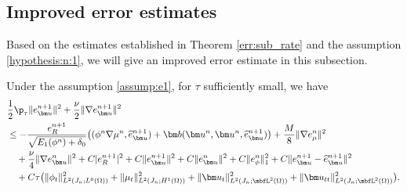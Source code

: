 \subsection{Improved error estimates } \label{subsec:full_rate}
Based on the estimates established in Theorem \ref{err:sub_rate} and the assumption \eqref{hypothesis:n:1}, we will give an improved error estimate in this subsection.

\begin{lemma}\label{err:full:eu}
	Under the assumption \eqref{assump:e1}, 	for $\tau$ sufficiently small, we have
	\begin{equation*}   
		\begin{aligned}
			& \frac{1}{2}\p_\tau \|e_{\bm u}^{n+1}\|^2  +\frac{\nu}{2}\|\nabla e_{\bm u}^{n+1}\|^2 \\
			&  \le  - \frac{e_R^{n+1}}{\sqrt{E_1(\phi^n)+\delta_0 } } \big( (\phi^n \nabla \mu^n,\widehat e_{\bm u}^{n+1}) + \bm b(\bm u^n,  \bm u^n, \widehat e_{\bm u}^{n+1})\big) + \frac{M}{8}\|\nabla e_\mu^n\|^2 \\
			& \quad + \frac{\nu}{4}\|\nabla e_{\bm u}^{n}\|^2 +  C|e_R^{n+1}|^2 + C\|e_{\bm u}^{n+1}\|^2  + C\|e_{\bm u}^n\|^2+C\|e_\phi^n\|_1^2 + C\|e_{\bm u}^{n+1}-\widehat{e}_{\bm u}^{n+1}\|^2 \\
			& \quad  +C\tau \big(\|\phi_t\|_{L^2(J_n ; L^6(\Omega))}^2 + \|\mu_t\|_{L^2(J_n ; H^1(\Omega))}^2 +\|\bm u_t\|_{L^2(J_n ; \mbfL^2(\Omega))}^2+\|\bm u_{tt}\|_{L^2(J_n; \mbfL^2(\Omega))}^2\big).
		\end{aligned}
	\end{equation*}
\end{lemma}
